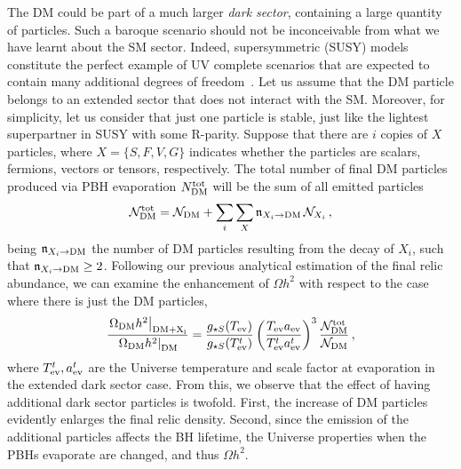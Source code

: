 \documentclass[aps,prd,reprint,twocolumn,preprintnumbers,floatfix,nofootinbib]{revtex4-1}
\newcommand{\Oh}{\Omega h^2}
\begin{document}
The DM could be part of a much larger \emph{dark sector}, containing a large quantity of particles. Such a baroque scenario should not be inconceivable from what we have learnt about the SM sector. Indeed, supersymmetric (SUSY) models constitute the perfect example of UV complete scenarios that are expected to contain many additional degrees of freedom~\cite{Green:1999yh}. Let us assume that the DM particle belongs to an extended sector that does not interact with the SM. Moreover, for simplicity, let us consider that just one particle is stable, just like the lightest superpartner in SUSY with some R-parity. Suppose that there are $i$ copies of $X$ particles, where $X=\{S,F,V,G\}$ indicates whether the particles are scalars, fermions, vectors or tensors, respectively. The total number of final DM particles produced via PBH evaporation $N_{\rm DM}^{\rm tot}$ will be the sum of all emitted particles 
\begin{align}
    {\cal N}_{\rm DM}^{\rm tot} = {\cal N}_{\rm DM} + \sum_i\sum_X \mathfrak{n}_{X_i\to\rm DM}\, {\cal N}_{X_i}\,,
\end{align}
being $\mathfrak{n}_{X_i\to\rm DM}$ the number of DM particles resulting from the decay of $X_i$, such that $\mathfrak{n}_{X_i\to\rm DM}\geq 2$. Following our previous analytical estimation of the final relic abundance, we can examine the enhancement of $\Omega h^2$ with respect to the case where there is just the DM particles,
\begin{align}
    \frac{\left.\Omega_{\rm DM} h^2\right|_{\rm DM+X_i}}{\left.\Omega_{\rm DM} h^2\right|_{\rm DM}}=\frac{g_{\star S}(T_{\rm ev})}{g_{\star S}(T_{\rm ev}^t)}\left(\frac{T_{\rm ev} a_{\rm ev}}{ T_{\rm ev}^t a_{\rm ev}^t}\right)^3\frac{{\cal N}_{\rm DM}^{\rm tot}}{{\cal N}_{\rm DM}}\,,
\end{align}
where $T_{\rm ev}^t, a_{\rm ev}^t$ are the Universe temperature and scale factor at evaporation in the extended dark sector case. From this, we observe that the effect of having additional dark sector particles is twofold. First, the increase of DM particles evidently enlarges the final relic density. Second, since the emission of the additional particles affects the BH lifetime, the Universe properties when the PBHs evaporate are changed, and thus $\Oh$.
\end{document}
